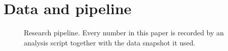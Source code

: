 \section{Data and pipeline}\label{app:lineage}

\begin{table}[h]
  \caption{Data lineage}\label{tab:lineage}
  \small
  
\end{table}

\begin{figure}[h]
  \centering
  
  \caption{Research pipeline. Every number in this paper is recorded by an analysis script
  together with the data snapshot it used.}\label{fig:pipeline}
\end{figure}
